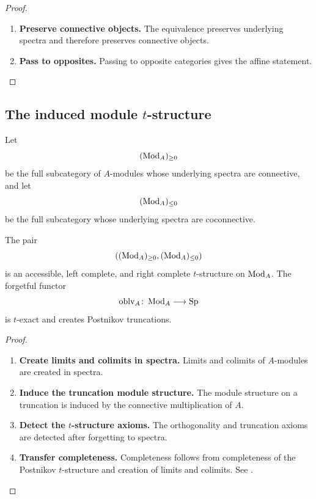\begin{proof}
\leavevmode
\begin{enumerate}[label=\textup{(\arabic*)}]
    \item \textbf{Preserve connective objects.}
    The equivalence preserves underlying spectra and therefore preserves
    connective objects.

    \item \textbf{Pass to opposites.}
    Passing to opposite categories gives the affine
    statement.
\end{enumerate}
\end{proof}

\subsection{The induced module \texorpdfstring{$t$}{t}-structure}

\begin{definition}
\label{def:module-postnikov-t-structure}
Let
\[
    (\operatorname{Mod}_{A})_{\geq0}
\]
be the full subcategory of $A$-modules whose underlying spectra are
connective, and let
\[
    (\operatorname{Mod}_{A})_{\leq0}
\]
be the full subcategory whose underlying spectra are coconnective.
\end{definition}

\begin{proposition}
\label{prop:induced-module-t-structure}
The pair
\[
    ((\operatorname{Mod}_{A})_{\geq0},(\operatorname{Mod}_{A})_{\leq0})
\]
is an accessible, left complete, and right complete $t$-structure on
$\operatorname{Mod}_A$. The forgetful functor
\[
    \operatorname{oblv}_{A}
    \colon
    \operatorname{Mod}_A
    \longrightarrow
    \operatorname{Sp}
\]
is $t$-exact and creates Postnikov truncations.
\end{proposition}

\begin{proof}
\leavevmode
\begin{enumerate}[label=\textup{(\arabic*)}]
    \item \textbf{Create limits and colimits in spectra.}
    Limits and colimits of $A$-modules are created in spectra.

    \item \textbf{Induce the truncation module structure.}
    The module
    structure on a truncation is induced by the connective multiplication of
    $A$.

    \item \textbf{Detect the $t$-structure axioms.}
    The orthogonality and truncation axioms are detected after
    forgetting to spectra.

    \item \textbf{Transfer completeness.}
    Completeness follows from completeness of the
    Postnikov $t$-structure and creation of limits and colimits. See
    \cite{LurieHigherAlgebra,LurieSAG}.
\end{enumerate}
\end{proof}

